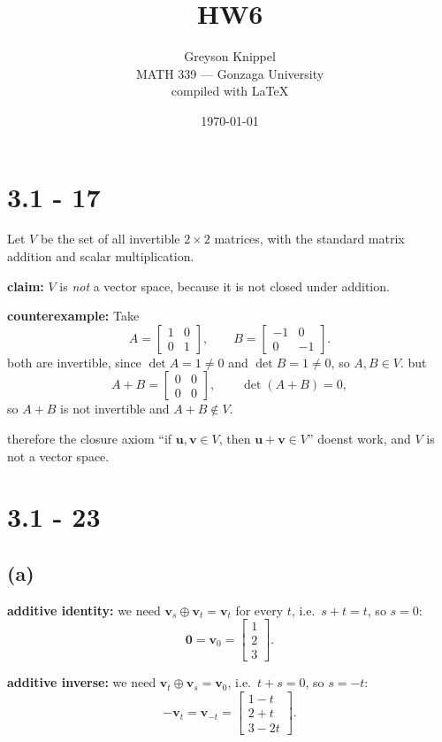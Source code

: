 \documentclass{article}
\title{HW6}
\author{
Greyson Knippel \\[4pt]
MATH 339 --- Gonzaga University \\[4pt]
compiled with \LaTeX{}
}
\date{\today}
\begin{document}
\maketitle

\section*{3.1 - 17}

Let $V$ be the set of all invertible $2 \times 2$ matrices, with the standard
matrix addition and scalar multiplication.

\textbf{claim:} $V$ is \emph{not} a vector space, because it is not closed
under addition.

\textbf{counterexample:} Take
\[
A = \begin{bmatrix} 1 & 0 \\ 0 & 1 \end{bmatrix},
\qquad
B = \begin{bmatrix} -1 & 0 \\ 0 & -1 \end{bmatrix}.
\]
both are invertible, since $\det A = 1 \neq 0$ and $\det B = 1 \neq 0$,
so $A, B \in V$. but
\[
A + B = \begin{bmatrix} 0 & 0 \\ 0 & 0 \end{bmatrix},
\qquad
\det(A + B) = 0,
\]
so $A + B$ is not invertible and $A + B \notin V$.

therefore the closure axiom ``if $\mathbf{u}, \mathbf{v} \in V$, then
$\mathbf{u} + \mathbf{v} \in V$'' doenst work, and $V$ is not a vector space.

\section*{3.1 - 23}

\subsection*{(a)}

\textbf{additive identity:} we need $\mathbf{v}_s \oplus \mathbf{v}_t = \mathbf{v}_t$
for every $t$, i.e.\ $s + t = t$, so $s = 0$:
\[
\mathbf{0} = \mathbf{v}_0 = \begin{bmatrix} 1 \\ 2 \\ 3 \end{bmatrix}.
\]

\textbf{additive inverse:} we need $\mathbf{v}_t \oplus \mathbf{v}_s = \mathbf{v}_0$,
i.e.\ $t + s = 0$, so $s = -t$:
\[
-\mathbf{v}_t = \mathbf{v}_{-t} = \begin{bmatrix} 1 - t \\ 2 + t \\ 3 - 2t \end{bmatrix}.
\]
\end{document}
